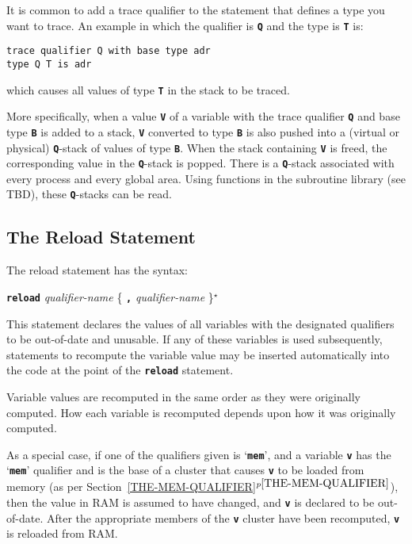 \documentclass[12pt]{article}
\makeatletter
\newcommand{\TT}[1]{{\tt \bfseries #1}}
\newcommand{\ttkey}[1]{\TT{#1}\index{#1@{\tt #1}}}
\newcommand{\itemref}[1]{\ref{#1}$^{p\pageref{#1}}$}
\newcommand{\STAR}{{\Large $^\star$}}
\newenvironment{indpar}[1][0.3in]%
	{\begin{list}{}%
		     {\setlength{\itemsep}{0in}%
		      \setlength{\topsep}{0in}%
		      \setlength{\parsep}{1ex}%
		      \setlength{\labelwidth}{#1}%
		      \setlength{\leftmargin}{#1}%
		      \addtolength{\leftmargin}{\labelsep}}%
	 \item}%
	{\end{list}}
\makeatother
\begin{document}
It is common to add a trace qualifier to the statement that
defines a type you want to trace.  An example in which the
qualifier is \TT{Q} and the type is \TT{T} is:
\begin{indpar}\begin{verbatim}
trace qualifier Q with base type adr
type Q T is adr
\end{verbatim}\end{indpar}
which causes all values of type \TT{T} in the stack to be
traced.

More specifically, when a value \TT{V} of a variable with the trace
qualifier \TT{Q} and base type \TT{B} is added to a stack,
\TT{V} converted to type \TT{B} is also
pushed into a (virtual or physical) \TT{Q}-stack of values of
type \TT{B}.
When the stack containing \TT{V} is freed, the corresponding
value in the \TT{Q}-stack is popped.  There is a \TT{Q}-stack
associated with every process and every global area.
Using functions in the
subroutine library (see TBD), these \TT{Q}-stacks can be read.

\subsection{The Reload Statement}
\label{THE-RELOAD-COMMAND}

The reload statement has the syntax:
\begin{center}
\ttkey{reload} {\em qualifier-name} \{ \TT{,} {\em qualifier-name} \}\STAR{}
\end{center}

This statement declares the values of all variables with the designated
qualifiers to be out-of-date and unusable.  If any of these variables
is used subsequently, statements to recompute the variable value
may be inserted automatically into the code at the point of the
\TT{reload} statement.

Variable values are recomputed in the same order as they were
originally computed.  How each variable is recomputed depends upon
how it was originally computed.

As a special case, if one of the qualifiers given is `\TT{mem}', and
a variable \TT{v} has the `\TT{mem}' qualifier and is the base of
a cluster that causes \TT{v} to be loaded from memory
(as per Section~\itemref{THE-MEM-QUALIFIER}), then the value
in RAM is assumed to have changed, and \TT{v} is declared to be out-of-date.
After the appropriate members of the \TT{v} cluster have been recomputed,
\TT{v} is reloaded from RAM.
\end{document}
